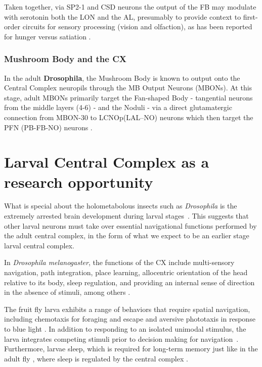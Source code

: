         Taken together, via SP2-1 and CSD neurons the output of the FB may modulate with serotonin both the LON and the AL, presumably to provide context to first-order circuits for sensory processing (vision and olfaction), as has been reported for hunger versus satiation \citep{vogt2021internalstate}.
        \subsubsection{Mushroom Body and the CX}
        In the adult \textbf{Drosophila}, the Mushroom Body is known to output onto the Central Complex neuropils through the MB Output Neurons (MBONs). At this stage, adult MBONs primarily target the Fan-shaped Body - tangential neurons from the middle layers (4-6) - and the Noduli - via a direct glutamatergic connection from MBON-30 to LCNOp(LAL–NO) neurons which then target the PFN (PB-FB-NO) neurons \citep{hulse2021connectome}.

\section{Larval Central Complex as a research opportunity}
    What is special about the holometabolous insects such as \textit{Drosophila} is the extremely arrested brain development during larval stages~\citep{andrade2019developmentally}. This suggests that other larval neurons must take over essential navigational functions performed by the adult central complex, in the form of what we expect to be an earlier stage larval central complex. 

    In \textit{Drosophila melanogaster}, the functions of the CX include multi-sensory navigation, path integration, place learning, allocentric orientation of the head relative to its body, sleep regulation, and providing an internal sense of direction in the absence of stimuli, among others \citep{hanesch1989neuronal, ofstad2011visual, seelig2013feature, PfeifferHomberg2014, Stone2017CXModel, franconville2018building, heinze2018principles, szuperak2018sleep, pisokas2020head, ShaferKeene2021sleep, fisher2022flexible}.

    The fruit fly larva exhibits a range of behaviors that require spatial navigation, including chemotaxis for foraging and escape \citep{fishilevich2005chemotaxis, khurana2013olfactory, Ebrahim2015OR49, davies2015model} and aversive phototaxis in response to blue light \citep{sawin1995phototaxis, gong2009phototaxis, KeeneSprecher2012photobehavior}.
    In addition to responding to an isolated unimodal stimulus, the larva integrates competing stimuli prior to decision making for navigation~\citep{gepner2015computations}.
    Furthermore, larvae sleep, which is required for long-term memory \citep{poe2023sleepmemory} just like in the adult fly \citep{donlea2011sleep, donlea2019sleep}, where sleep is regulated by the central complex \citep{ShaferKeene2021sleep}.

